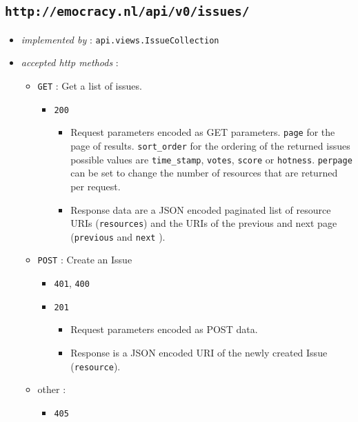 \documentclass[a4paper]{report}
\begin{document}
\subsection{\texttt{http://emocracy.nl/api/v0/issues/}}
\begin{itemize}
    \item{\textsl{implemented by} : \texttt{api.views.IssueCollection}}
    \item{\textsl{accepted http methods} :
        \begin{itemize}
            \item{\texttt{GET} : Get a list of issues.
                \begin{itemize}
                    \item{\texttt{200}
                    \begin{itemize}
                        \item{Request parameters encoded as GET parameters. 
                        \texttt{page} for the page of results. \texttt{sort\_order}
                        for the ordering of the returned issues possible values are
                        \texttt{time\_stamp}, \texttt{votes}, \texttt{score} or \texttt{hotness}.
                        \texttt{perpage} can be set to change the number of 
                        resources that are returned per request.
                        }
                        \item{Response data are a JSON encoded paginated list of 
                        resource URIs (\texttt{resources}) and the URIs of the 
                        previous and next page (\texttt{previous} and \texttt{next}
                        ).}
                    \end{itemize}
                    }
                \end{itemize}
             }
            \item{\texttt{POST} : Create an Issue
                \begin{itemize}
                    \item{\texttt{401}, \texttt{400}}
                    \item{\texttt{201}
                    \begin{itemize}
                        \item{Request parameters encoded as POST data.}
                        \item{Response is a JSON encoded URI of the newly
                        created Issue (\texttt{resource}).}
                    \end{itemize}
                    }
                \end{itemize}
            }
            \item{other : 
                \begin{itemize}
                    \item{\texttt{405}}
                \end{itemize}
            }
        \end{itemize}
    }
\end{itemize}
\end{document}
